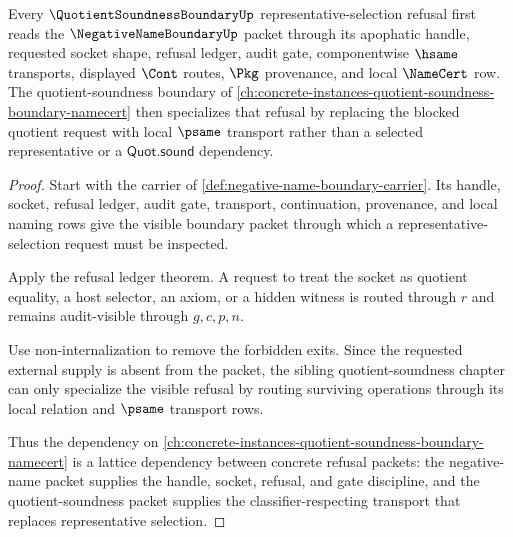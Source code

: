 \begin{theorem}\label{thm:negative-name-boundary-quotient-soundness-lattice-link}
Every $\QuotientSoundnessBoundaryUp$ representative-selection refusal first reads the $\NegativeNameBoundaryUp$ packet through its apophatic handle, requested socket shape, refusal ledger, audit gate, componentwise $\hsame$ transports, displayed $\Cont$ routes, $\Pkg$ provenance, and local $\NameCert$ row. The quotient-soundness boundary of \autoref{ch:concrete-instances-quotient-soundness-boundary-namecert} then specializes that refusal by replacing the blocked quotient request with local $\psame$ transport rather than a selected representative or a $\mathsf{Quot.sound}$ dependency.
\end{theorem}
\begin{proof}
Start with the carrier of \autoref{def:negative-name-boundary-carrier}. Its handle, socket, refusal ledger, audit gate, transport, continuation, provenance, and local naming rows give the visible boundary packet through which a representative-selection request must be inspected.

Apply the refusal ledger theorem. A request to treat the socket as quotient equality, a host selector, an axiom, or a hidden witness is routed through $r$ and remains audit-visible through $g,c,p,n$.

Use non-internalization to remove the forbidden exits. Since the requested external supply is absent from the packet, the sibling quotient-soundness chapter can only specialize the visible refusal by routing surviving operations through its local relation and $\psame$ transport rows.

Thus the dependency on \autoref{ch:concrete-instances-quotient-soundness-boundary-namecert} is a lattice dependency between concrete refusal packets: the negative-name packet supplies the handle, socket, refusal, and gate discipline, and the quotient-soundness packet supplies the classifier-respecting transport that replaces representative selection.
\end{proof}

